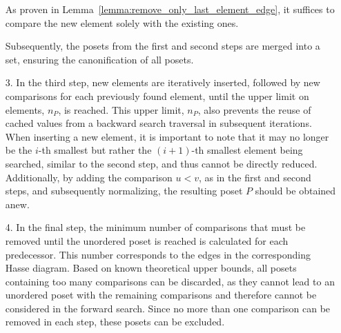 \documentclass[twoside,leqno,twocolumn]{article}
\begin{document}
\begin{itemize}
    As proven in Lemma~\ref{lemma:remove_only_last_element_edge}, it suffices to compare the new element solely with the existing ones.

    Subsequently, the posets from the first and second steps are merged into a set, ensuring the canonification of all posets.

  \item[3.]
    In the third step, new elements are iteratively inserted, followed by new comparisons for each previously found element, until the upper limit on elements, $n_P$, is reached.
    This upper limit, $n_P$, also prevents the reuse of cached values from a backward search traversal in subsequent iterations.
    When inserting a new element, it is important to note that it may no longer be the $i$-th smallest but rather the $(i + 1)$-th smallest element being searched, similar to the second step, and thus cannot be directly reduced.
    Additionally, by adding the comparison $u < v$, as in the first and second steps, and subsequently normalizing, the resulting poset $P$ should be obtained anew.

  \item[4.]
    In the final step, the minimum number of comparisons that must be removed until the unordered poset is reached is calculated for each predecessor.
    This number corresponds to the edges in the corresponding Hasse diagram.
    Based on known theoretical upper bounds, all posets containing too many comparisons can be discarded, as they cannot lead to an unordered poset with the remaining comparisons and therefore cannot be considered in the forward search.
    Since no more than one comparison can be removed in each step, these posets can be excluded.
\end{itemize}
\end{document}
